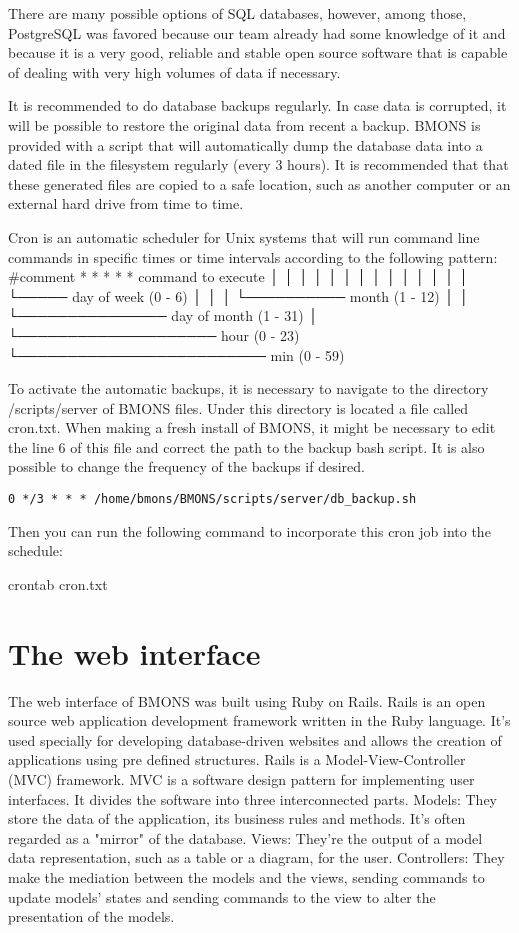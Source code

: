 There are many possible options of SQL databases, however, among those, PostgreSQL was favored because our team already had some knowledge of it and because it is a very good, reliable and stable open source software that is capable of dealing with very high volumes of data if necessary.

It is recommended to do database backups regularly. In case data is corrupted, it will be possible to restore the original data from recent a backup. BMONS is provided with a script that will automatically dump the database data into a dated file in the filesystem regularly (every 3 hours). It is recommended that that these generated files are copied to a safe location, such as another computer or an external hard drive from time to time.

Cron is an automatic scheduler for Unix systems that will run command line commands in specific times or time intervals according to the following pattern:
  #comment
  * * * * *  command to execute
  │ │ │ │ │
  │ │ │ │ │
  │ │ │ │ └───── day of week (0 - 6)
  │ │ │ └────────── month (1 - 12)
  │ │ └─────────────── day of month (1 - 31)
  │ └──────────────────── hour (0 - 23)
  └───────────────────────── min (0 - 59)

To activate the automatic backups, it is necessary to navigate to the directory /scripts/server of BMONS files. Under this directory is located a file called cron.txt. When making a fresh install of BMONS, it might be necessary to edit the line 6 of this file and correct the path to the backup bash script. It is also possible to change the frequency of the backups if desired. 
 
\texttt{0 */3 * * * /home/bmons/BMONS/scripts/server/db\_backup.sh}

Then you can run the following command to incorporate this cron job into the schedule:

crontab cron.txt

\section{The web interface}

The web interface of BMONS was built using Ruby on Rails. Rails is an open source web application development framework written in the Ruby language. It's used specially for developing database-driven websites and allows the creation of applications using pre defined structures. Rails is a Model-View-Controller (MVC) framework. MVC is a software design pattern for implementing user interfaces. It divides the software into three interconnected parts. 
Models: They store the data of the application, its business rules and methods. It's often regarded as a "mirror" of the database.
Views: They're the output of a model data representation, such as a table or a diagram, for the user.
Controllers: They make the mediation between the models and the views, sending commands to update models' states and sending commands to the view to alter the presentation of the models.

